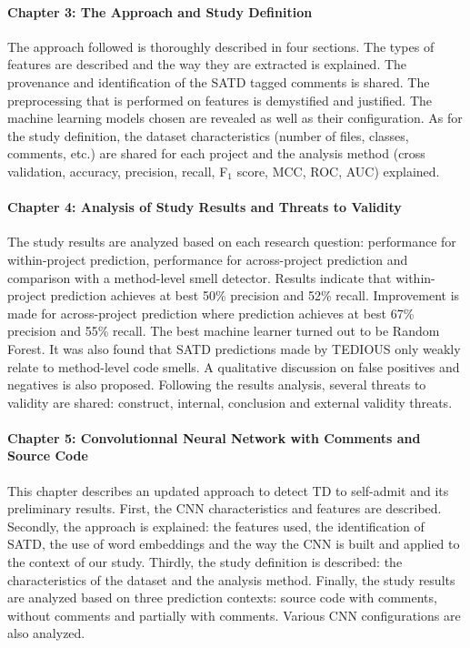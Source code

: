 \paragraph{Chapter 3: The Approach and Study Definition}
The approach followed is thoroughly described in four sections. The types of features are described and the way they are extracted is explained. The provenance and identification of the \ac{SATD} tagged comments is shared. The preprocessing that is performed on features is demystified and justified. The machine learning models chosen are revealed as well as their configuration. As for the study definition, the dataset characteristics (number of files, classes, comments, etc.) are shared for each project and the analysis method (cross validation, accuracy, precision, recall, F$_{1}$ score, \ac{MCC}, \ac{ROC}, \ac{AUC}) explained.

\paragraph{Chapter 4: Analysis of Study Results and Threats to Validity}
The study results are analyzed based on each research question: performance for within-project prediction, performance for across-project prediction and comparison with a method-level smell detector. Results indicate that within-project prediction achieves at best 50\% precision and 52\% recall. Improvement is made for across-project prediction where prediction achieves at best 67\% precision and 55\% recall. The best machine learner turned out to be Random Forest. It was also found that \ac{SATD} predictions made by \ac{TEDIOUS} only weakly relate to method-level code smells. A qualitative discussion on false positives and negatives is also proposed. Following the results analysis, several threats to validity are shared: construct, internal, conclusion and external validity threats.

\paragraph{Chapter 5: Convolutionnal Neural Network with Comments and Source Code} This chapter describes an updated approach to detect \ac{TD} to self-admit and its preliminary results. First, the \ac{CNN} characteristics and features are described. Secondly, the approach is explained: the features used, the identification of \ac{SATD}, the use of word embeddings and the way the \ac{CNN} is built and applied to the context of our study. Thirdly, the study definition is described: the characteristics of the dataset and the analysis method. Finally, the study results are analyzed based on three prediction contexts: source code with comments, without comments and partially with comments. Various \ac{CNN} configurations are also analyzed.









